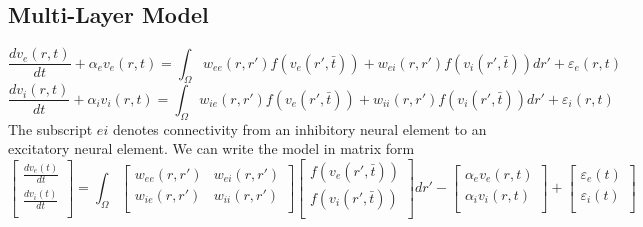\documentclass[onecolumn,draftcls]{IEEEtran}
\begin{document}
\subsection{Multi-Layer Model}
\begin{equation}\label{ExcitatoryLayer}
\frac{dv_e\left( {r,t} \right)}{{dt}} + \alpha_ev_e\left( {r,t} \right) = \int_\Omega  {w_{ee}\left( {r,r'} \right)f\left( v_e\left( r',\bar t \right) \right) + w_{ei}\left( {r,r'} \right)f\left( v_i\left( r',\bar t \right) \right)dr'}  +\varepsilon_e\left( {r,t} \right)
\end{equation}
\begin{equation}\label{InhibitoryLayer}
\frac{dv_i\left( {r,t} \right)}{{dt}} + \alpha_iv_i\left( {r,t} \right) = \int_\Omega  {w_{ie}\left( {r,r'} \right)f\left( v_e\left( r',\bar t \right) \right) + w_{ii}\left( {r,r'} \right)f\left( v_i\left( r',\bar t \right) \right)dr'}  +\varepsilon_i\left( {r,t} \right)
\end{equation}
The subscript $ei$ denotes connectivity from an inhibitory neural element to an excitatory neural element. We can write the model in matrix form
\begin{equation}\label{matrixEquation}
\left[ {\begin{array}{*{20}{c}}
   {\frac{{d{v_e}\left( t \right)}}
{{dt}}}  \\
   {\frac{{d{v_i}\left( t \right)}}
{{dt}}}  \\

 \end{array} } \right] = \int_\Omega  {\left[ {\begin{array}{*{20}{c}}
   {{w_{ee}}\left( {r,r'} \right)} & {{w_{ei}}\left( {r,r'} \right)}  \\
   {{w_{ie}}\left( {r,r'} \right)} & {{w_{ii}}\left( {r,r'} \right)}  \\

 \end{array} } \right]} \left[ {\begin{array}{*{20}{c}}
   {f\left( {{v_e}\left( {r',\bar{t}} \right)} \right)}  \\
   {f\left( {{v_i}\left( {r',\bar{t}} \right)} \right)}  \\

 \end{array} } \right]dr' - \left[ {\begin{array}{*{20}{c}}
   {{\alpha _e}{v_e}\left( {r,t} \right)}  \\
   {{\alpha _i}{v_i}\left( {r,t} \right)}  \\

 \end{array} } \right] + \left[ {\begin{array}{*{20}{c}}
   {{\varepsilon _e}\left( t \right)}  \\
   {{\varepsilon _i}\left( t \right)}  \\

 \end{array} } \right]
\end{equation}
\end{document}
